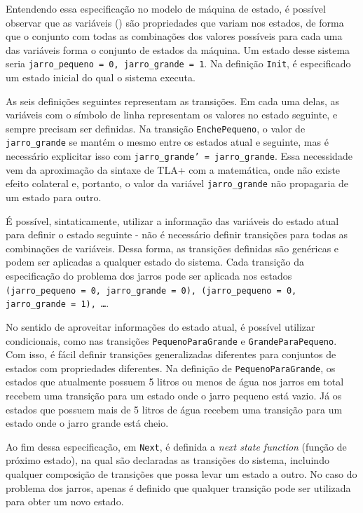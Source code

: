 Entendendo essa especificação no modelo de máquina de estado, é possível observar que as variáveis (\VARIABLES) são propriedades que variam nos estados, de forma que o conjunto com todas as combinações dos valores possíveis para cada uma das variáveis forma o conjunto de estados da máquina. Um estado desse sistema seria \texttt{jarro\_pequeno = 0, jarro\_grande = 1}. Na definição \texttt{Init}, é especificado um estado inicial do qual o sistema executa.

As seis definições seguintes representam as transições. Em cada uma delas, as variáveis com o símbolo de linha representam os valores no estado seguinte, e sempre precisam ser definidas. Na transição \texttt{EnchePequeno}, o valor de \texttt{jarro\_grande} se mantém o mesmo entre os estados atual e seguinte, mas é necessário explicitar isso com \texttt{jarro\_grande' = jarro\_grande}. Essa necessidade vem da aproximação da sintaxe de TLA+ com a matemática, onde não existe efeito colateral e, portanto, o valor da variável \texttt{jarro\_grande} não propagaria de um estado para outro.

É possível, sintaticamente, utilizar a informação das variáveis do estado atual para definir o estado seguinte - não é necessário definir transições para todas as combinações de variáveis. Dessa forma, as transições definidas são genéricas e podem ser aplicadas a qualquer estado do sistema. Cada transição da especificação do problema dos jarros pode ser aplicada nos estados \texttt{(jarro\_pequeno = 0, jarro\_grande = 0), (jarro\_pequeno = 0, jarro\_grande = 1), \dots}.

No sentido de aproveitar informações do estado atual, é possível utilizar condicionais, como nas transições \texttt{PequenoParaGrande} e \texttt{GrandeParaPequeno}. Com isso, é fácil definir transições generalizadas diferentes para conjuntos de estados com propriedades diferentes. Na definição de \texttt{PequenoParaGrande}, os estados que atualmente possuem 5 litros ou menos de água nos jarros em total recebem uma transição para um estado onde o jarro pequeno está vazio. Já os estados que possuem mais de 5 litros de água recebem uma transição para um estado onde o jarro grande está cheio.

Ao fim dessa especificação, em \texttt{Next}, é definida a \textit{next state function} (função de próximo estado), na qual são declaradas as transições do sistema, incluindo qualquer composição de transições que possa levar um estado a outro. No caso do problema dos jarros, apenas é definido que qualquer transição pode ser utilizada para obter um novo estado.

